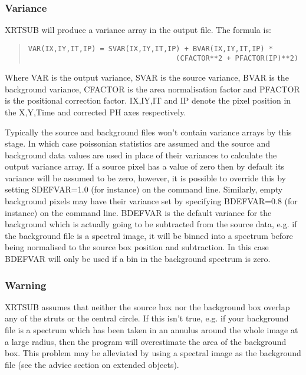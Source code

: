 \documentclass{book}
\renewcommand{\_}{{\tt\char'137}}     %
\begin{document}
\subsubsection{Variance}
XRTSUB will produce a variance array in the output file.
The formula is:

\begin{quote}\begin{verbatim}
VAR(IX,IY,IT,IP) = SVAR(IX,IY,IT,IP) + BVAR(IX,IY,IT,IP) *
                                   (CFACTOR**2 + PFACTOR(IP)**2)
\end{verbatim}\end{quote}
Where VAR is the output variance, SVAR is the source variance, BVAR is
the background variance, CFACTOR is the area normalisation factor and
PFACTOR is the positional correction factor. IX,IY,IT and IP denote the
pixel position in the X,Y,Time and corrected PH axes respectively.

Typically the source and background files won't contain variance arrays
by this stage. In which case poissonian statistics are assumed and the
source and background data values are used in place of their variances
to calculate the output variance array. If a source pixel has a value
of zero then by default its variance will be assumed to be zero, however,
it is possible to override this by setting
SDEFVAR=1.0 (for instance) on the command line. Similarly, empty
background pixels may have their variance set by specifying BDEFVAR=0.8
(for instance) on the command line. BDEFVAR is the default variance for
the background which is actually going to be subtracted from the source
data, e.g. if the background file is a spectral image, it will be binned
into a spectrum before being normalised to the source box position and
subtraction. In this case BDEFVAR will only be used if a bin in the
background spectrum is zero.

\subsubsection{Warning}
XRTSUB assumes that neither the source box nor the background box
overlap any of the struts or the central circle. If this isn't true,
e.g. if your background file is a spectrum which has been taken in
an annulus around the whole image at a large radius, then the program
will overestimate the area of the background box. This problem may
be alleviated by using a spectral image as the background file (see
the advice section on extended objects).
\end{document}
